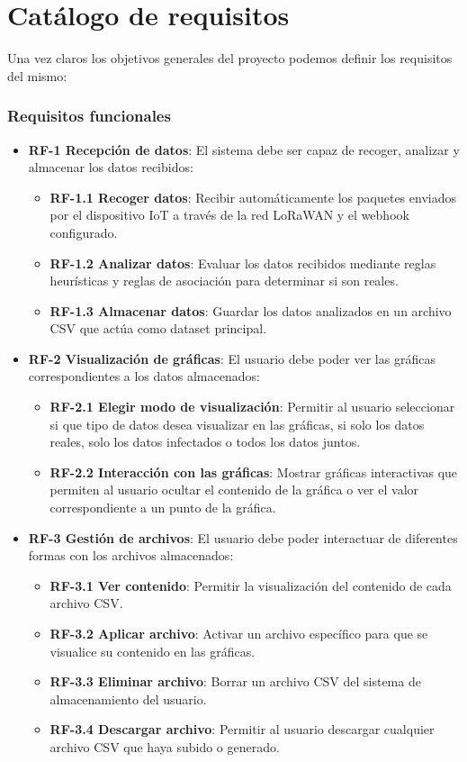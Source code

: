 \section{Catálogo de requisitos}
Una vez claros los objetivos generales del proyecto podemos definir los requisitos del mismo:
\subsubsection{Requisitos funcionales}

\begin{itemize}
    \item \textbf{RF-1 Recepción de datos}: El sistema debe ser capaz de recoger, analizar y almacenar los datos recibidos:
    \begin{itemize}
        \item \textbf{RF-1.1 Recoger datos}: Recibir automáticamente los paquetes enviados por el dispositivo IoT a través de la red LoRaWAN y el webhook configurado.
        \item \textbf{RF-1.2 Analizar datos}: Evaluar los datos recibidos mediante reglas heurísticas y reglas de asociación para determinar si son reales.
        \item \textbf{RF-1.3 Almacenar datos}: Guardar los datos analizados en un archivo CSV que actúa como dataset principal.
    \end{itemize}

    \item \textbf{RF-2 Visualización de gráficas}: El usuario debe poder ver las gráficas correspondientes a los datos almacenados:
    \begin{itemize}
        \item \textbf{RF-2.1 Elegir modo de visualización}: Permitir al usuario seleccionar si que tipo de datos desea visualizar en las gráficas, si solo los datos reales, solo los datos infectados o todos los datos juntos.
        \item \textbf{RF-2.2 Interacción con las gráficas}: Mostrar gráficas interactivas que permiten al usuario ocultar el contenido de la gráfica o ver el valor correspondiente a un punto de la gráfica.
    \end{itemize}

    \item \textbf{RF-3 Gestión de archivos}: El usuario debe poder interactuar de diferentes formas con los archivos almacenados:
    \begin{itemize}
        \item \textbf{RF-3.1 Ver contenido}: Permitir la visualización del contenido de cada archivo CSV.
        \item \textbf{RF-3.2 Aplicar archivo}: Activar un archivo específico para que se visualice su contenido en las gráficas.
        \item \textbf{RF-3.3 Eliminar archivo}: Borrar un archivo CSV del sistema de almacenamiento del usuario.
        \item \textbf{RF-3.4 Descargar archivo}: Permitir al usuario descargar cualquier archivo CSV que haya subido o generado.
    \end{itemize}


\end{itemize}

